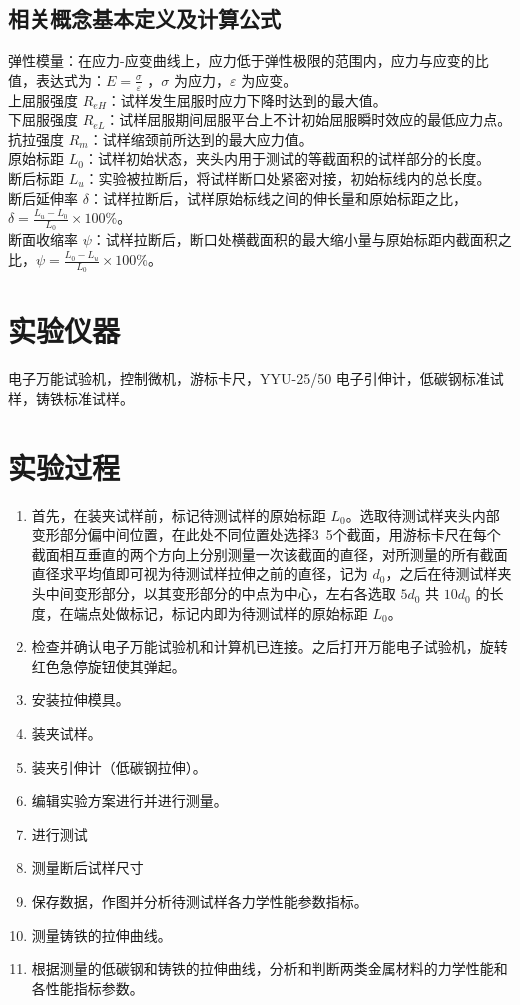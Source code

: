 \documentclass[a4paper,utf8]{article}
\begin{document}
\subsection{相关概念基本定义及计算公式}
\noindent 弹性模量：在应力-应变曲线上，应力低于弹性极限的范围内，应力与应变的比值，表达式为：\linebreak $E =\displaystyle \frac{\sigma}{\varepsilon}$ ，$\sigma$ 为应力，$\varepsilon$ 为应变。\\
上屈服强度 $R_{eH}$：试样发生屈服时应力下降时达到的最大值。\\
下屈服强度 $R_{eL}$：试样屈服期间屈服平台上不计初始屈服瞬时效应的最低应力点。\\
抗拉强度 $R_m$：试样缩颈前所达到的最大应力值。\\
原始标距 $L_0$：试样初始状态，夹头内用于测试的等截面积的试样部分的长度。\\
断后标距 $L_u$：实验被拉断后，将试样断口处紧密对接，初始标线内的总长度。\\
断后延伸率 $\delta$：试样拉断后，试样原始标线之间的伸长量和原始标距之比，$\delta = \displaystyle\frac{L_u-L_0}{L_0}\times 100\%$。\\
断面收缩率 $\psi$：试样拉断后，断口处横截面积的最大缩小量与原始标距内截面积之比，\linebreak $\psi = \displaystyle\frac{L_0-L_u}{L_0}\times 100\%$。
\section{实验仪器}%
电子万能试验机，控制微机，游标卡尺，YYU-25/50 电子引伸计，低碳钢标准试样，铸铁标准试样。
\section{实验过程}%
\begin{enumerate}
    \item 首先，在装夹试样前，标记待测试样的原始标距 $L_0$。选取待测试样夹头内部变形部分偏中间位置，在此处不同位置处选择3~5个截面，用游标卡尺在每个截面相互垂直的两个方向上分别测量一次该截面的直径，对所测量的所有截面直径求平均值即可视为待测试样拉伸之前的直径，记为 $d_0$，之后在待测试样夹头中间变形部分，以其变形部分的中点为中心，左右各选取 $5d_0$ 共 $10d_0$ 的长度，在端点处做标记，标记内即为待测试样的原始标距 $L_0$。
    \item 检查并确认电子万能试验机和计算机已连接。之后打开万能电子试验机，旋转红色急停旋钮使其弹起。
    \item 安装拉伸模具。
    \item 装夹试样。
    \item 装夹引伸计（低碳钢拉伸）。
    \item 编辑实验方案进行并进行测量。
    \item 进行测试
    \item 测量断后试样尺寸
    \item 保存数据，作图并分析待测试样各力学性能参数指标。
    \item 测量铸铁的拉伸曲线。
    \item 根据测量的低碳钢和铸铁的拉伸曲线，分析和判断两类金属材料的力学性能和各性能指标参数。
\end{enumerate}
\newpage
\end{document}
